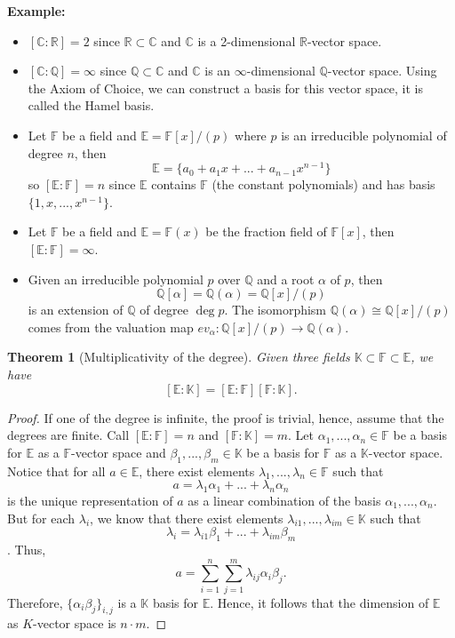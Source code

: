 \documentclass{article}
\newtheorem*{theorem}{Theorem}
\newcommand{\C}{\mathbb{C}}
\newcommand{\R}{\mathbb{R}}
\newcommand{\Q}{\mathbb{Q}}
\newcommand{\F}{\mathbb{F}}
\newcommand{\E}{\mathbb{E}}
\newcommand{\K}{\mathbb{K}}
\newcommand{\isomorphic}{\cong}
\newenvironment{example}{\noindent\textbf{Example:} \vspace{-0.2cm}\begin{itemize}}{\end{itemize}}
\begin{document}
\begin{example}
    \item $[\C : \R] = 2$ since $\R \subset \C$ and $\C$ is a 2-dimensional $\R$-vector space.
    \item $[\C : \Q] = \infty$ since $\Q \subset \C$ and $\C$ is an $\infty$-dimensional $\Q$-vector space. Using the Axiom of Choice, we can construct a basis for this vector space, it is called the Hamel basis.
    \item Let $\F$ be a field and $\E = \F[x]/(p)$ where $p$ is an irreducible polynomial of degree $n$, then 
    $$\E = \{a_0 + a_1x + ... + a_{n-1}x^{n-1}\}$$
    so $[\E : \F] = n$ since $\E$ contains $\F$ (the constant polynomials) and has basis $\{1, x, ..., x^{n-1}\}$.
    \item Let $\F$ be a field and $\E = \F(x)$ be the fraction field of $\F[x]$, then $[\E : \F] = \infty$.
    \item Given an irreducible polynomial $p$ over $\Q$ and a root $\alpha$ of $p$, then 
    $$\Q[\alpha] = \Q(\alpha) = \Q[x] /(p)$$
    is an extension of $\Q$ of degree $\deg p$. The isomorphism $\Q(\alpha) \isomorphic \Q[x] /(p)$ comes from the valuation map $ev_\alpha : \Q[x] /(p) \to \Q(\alpha)$.
\end{example}

\begin{theorem}[Multiplicativity of the degree]
    Given three fields $\K \subset \F \subset \E$, we have
    $$[\E : \K] = [\E : \F] [\F : \K].$$
\end{theorem}

\begin{proof}
    If one of the degree is infinite, the proof is trivial, hence, assume that the degrees are finite. Call $[\E : \F] = n$ and $[\F : \K] = m$. Let $\alpha_1, ..., \alpha_n \in \F$ be a basis for $\E$ as a $\F$-vector space and $\beta_1, ..., \beta_m \in \K$ be a basis for $\F$ as a $\K$-vector space. Notice that for all $a \in \E$, there exist elements $\lambda_1, ..., \lambda_n \in \F$ such that
    $$a = \lambda_1 \alpha_1  + ... + \lambda_n \alpha_n$$
    is the unique representation of $a$ as a linear combination of the basis $\alpha_1, ..., \alpha_n$. But for each $\lambda_i$, we know that there exist elements $\lambda_{i1}, ..., \lambda_{im} \in \K$ such that 
    $$\lambda_i = \lambda_{i1}\beta_1 + ... + \lambda_{im}\beta_m$$. Thus,
    $$a = \sum_{i=1}^{n}\sum_{j=1}^{m}\lambda_{ij}\alpha_i \beta_j.$$
    Therefore, $\{\alpha_i \beta_j\}_{i,j}$ is a $\K$ basis for $\E$. Hence, it follows that the dimension of $\E$ as $K$-vector space is $n\cdot m$.
\end{proof}
\end{document}
